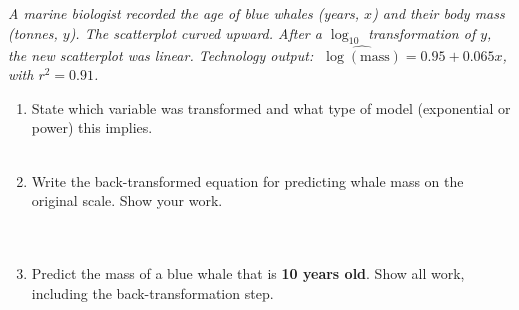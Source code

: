 \documentclass[10pt]{article}
\begin{document}
\namedateperiod

\vspace{0.18in}

\begin{tcolorbox}[colback=sky, colframe=navy, boxrule=0.9pt, arc=2mm,
    left=4mm, right=4mm, top=2.5mm, bottom=2.5mm]
\small\textit{A marine biologist recorded the age of blue whales (years, $x$) and their body
mass (tonnes, $y$). The scatterplot curved upward. After a $\log_{10}$ transformation of $y$,
the new scatterplot was linear. Technology output:
$\;\widehat{\log(\text{mass})} = 0.95 + 0.065x$, with $r^2 = 0.91$.}
\end{tcolorbox}

\vspace{0.16in}

\begin{enumerate}[leftmargin=1.6em, itemsep=0.16in]

  \item State which variable was transformed and what type of model (exponential or power)
        this implies.\\[8pt]
        \writeline\\[3pt]\writeline

  \item Write the back-transformed equation for predicting whale mass on the original scale.
        Show your work.\\[8pt]
        \writeline\\[3pt]\writeline\\[3pt]\writeline

  \item Predict the mass of a blue whale that is \textbf{10 years old}. Show all work,
        including the back-transformation step.\\[8pt]
        \writeline\\[3pt]\writeline\\[3pt]\writeline

\end{enumerate}

\vspace{0.12in}
\end{document}
